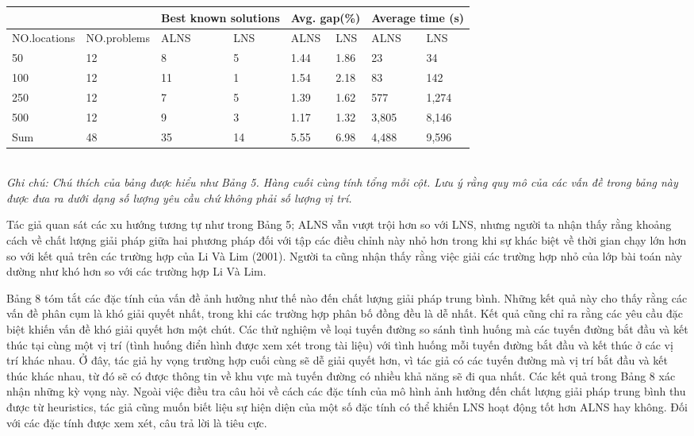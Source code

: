 \begin{table}[caption={Summary of Results Obtained on New Instances}, label=tab:2]
    \begin{tabular}{@{}llllllll@{}}
        \toprule
                    &           & \multicolumn{2}{l}{\footnotesize{Best known solutions}}& \multicolumn{2}{l}{\footnotesize{Avg. gap(\%)}}& \multicolumn{2}{l}{\footnotesize{Average time (s)}} \\ 
        \hline            
        \footnotesize{NO.locations}&\scriptsize{NO.problems}&\footnotesize{ALNS}&\footnotesize{LNS}&\footnotesize{ALNS}&\footnotesize{LNS}&\footnotesize{ALNS}&\footnotesize{LNS} \\ \midrule
        50  &12 &8  &5 &1.44 &1.86 &23    &34  \\
        100 &12 &11 &1 &1.54 &2.18 &83    &142  \\
        250 &12 &7  &5 &1.39 &1.62 &577   &1,274 \\ 
        500 &12 &9  &3 &1.17 &1.32 &3,805 &8,146 \\     
        Sum &48 &35 &14&5.55 &6.98 &4,488 &9,596 \\     \bottomrule
        \end{tabular} \\
        \justify
        \textit{Ghi chú: Chú thích của bảng được hiểu như Bảng 5. Hàng cuối cùng tính tổng mỗi cột. Lưu ý rằng quy mô của các vấn đề trong bảng này được đưa ra dưới dạng số lượng yêu cầu chứ không phải số lượng vị trí.}
\end{table}

Tác giả quan sát các xu hướng tương tự như trong Bảng 5; ALNS vẫn vượt trội hơn so với LNS, nhưng người ta nhận thấy rằng khoảng cách về chất lượng giải pháp giữa hai phương pháp đối với tập các điều chỉnh này nhỏ hơn trong khi sự khác biệt về thời gian chạy lớn hơn so với kết quả trên các trường hợp của Li Và Lim (2001). Người ta cũng nhận thấy rằng việc giải các trường hợp nhỏ của lớp bài toán này dường như khó hơn so với các trường hợp Li Và Lim.

Bảng 8 tóm tắt các đặc tính của vấn đề ảnh hưởng như thế nào đến chất lượng giải pháp trung bình. Những kết quả này cho thấy rằng các vấn đề phân cụm là khó giải quyết nhất, trong khi các trường hợp phân bố đồng đều là dễ nhất. Kết quả cũng chỉ ra rằng các yêu cầu đặc biệt khiến vấn đề khó giải quyết hơn một chút. Các thử nghiệm về loại tuyến đường so sánh tình huống mà các tuyến đường bắt đầu và kết thúc tại cùng một vị trí (tình huống điển hình được xem xét trong tài liệu) với tình huống mỗi tuyến đường bắt đầu và kết thúc ở các vị trí khác nhau. Ở đây, tác giả hy vọng trường hợp cuối cùng sẽ dễ giải quyết hơn, vì tác giả có các tuyến đường mà vị trí bắt đầu và kết thúc khác nhau, từ đó sẽ có được thông tin về khu vực mà tuyến đường có nhiều khả năng sẽ đi qua nhất. Các kết quả trong Bảng 8 xác nhận những kỳ vọng này.
Ngoài việc điều tra câu hỏi về cách các đặc tính của mô hình ảnh hưởng đến chất lượng giải pháp trung bình thu được từ heuristics, tác giả cũng muốn biết liệu sự hiện diện của một số đặc tính có thể khiến LNS hoạt động tốt hơn ALNS hay không. Đối với các đặc tính được xem xét, câu trả lời là tiêu cực.

